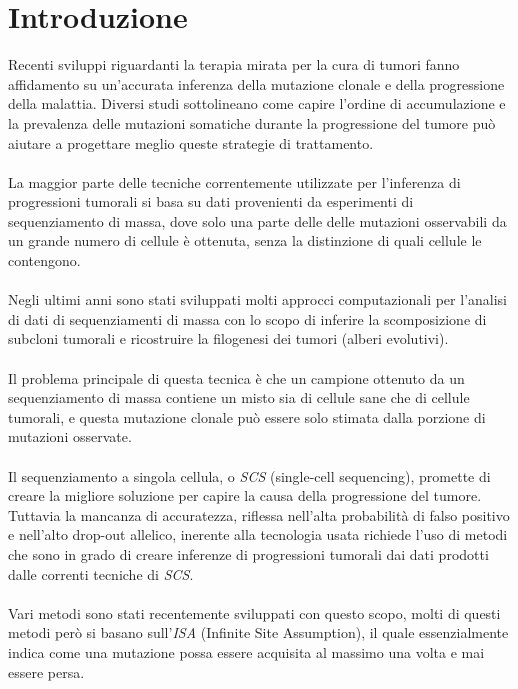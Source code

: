 \documentclass[12pt]{report}
\begin{document}
\onehalfspacing
{\pagestyle{plain}
  \tableofcontents
  \cleardoublepage}

\chapter{Introduzione}

  Recenti sviluppi riguardanti la terapia mirata per la cura di tumori fanno affidamento su un'accurata inferenza della mutazione clonale e della progressione della malattia.
  Diversi studi\cite{Morrissy2016}\cite{Wang2016} sottolineano come capire l'ordine di accumulazione e la prevalenza delle mutazioni somatiche durante la progressione del tumore può aiutare a progettare meglio queste strategie di trattamento.\\\\
  La maggior parte delle tecniche correntemente utilizzate per l'inferenza di progressioni tumorali si basa su dati provenienti da esperimenti di sequenziamento di massa, dove solo una parte delle delle mutazioni osservabili da un grande numero di cellule è ottenuta, senza la distinzione di quali cellule le contengono.\\\\
  Negli ultimi anni sono stati sviluppati molti approcci computazionali per l'analisi di dati di sequenziamenti di massa con lo scopo di inferire la scomposizione di subcloni tumorali e ricostruire la filogenesi dei tumori (alberi evolutivi)\cite{Bonizzoni227801}.\\\\
  Il problema principale di questa tecnica è che un campione ottenuto da un sequenziamento di massa contiene un misto sia di cellule sane che di cellule tumorali, e questa mutazione clonale può essere solo stimata dalla porzione di mutazioni osservate.\\\\
  Il sequenziamento a singola cellula, o \emph{SCS} (single-cell sequencing), promette di creare la migliore soluzione per capire la causa della progressione del tumore.
  Tuttavia la mancanza di accuratezza, riflessa nell'alta probabilità di falso positivo e nell'alto drop-out allelico, inerente alla tecnologia usata richiede l'uso di metodi che sono in grado di creare inferenze di progressioni tumorali dai dati prodotti dalle correnti tecniche di \emph{SCS}.\\\\
  Vari metodi sono stati recentemente sviluppati con questo scopo, molti di questi metodi però si basano sull'\emph{ISA} (Infinite Site Assumption), il quale essenzialmente indica come una mutazione possa essere acquisita al massimo una volta e mai essere persa.
\end{document}
